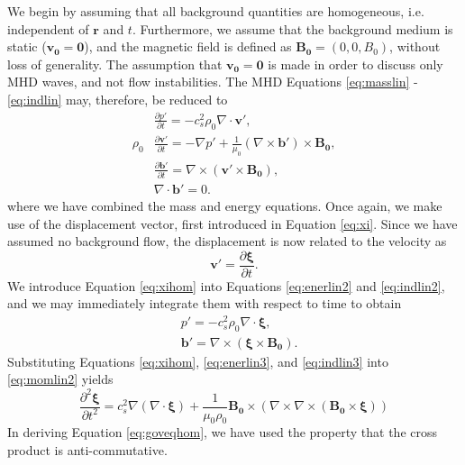 We begin by assuming that all background quantities are homogeneous, i.e. independent of $\mathbf{r}$ and $t$. 
Furthermore, we assume that the background medium is static ($\mathbf{v_0} = \mathbf 0$), and the magnetic field is defined as $\mathbf{B_0} = (0, 0, B_0)$, without loss of generality.
The assumption that $\mathbf{v_0} = \mathbf 0$ is made in order to discuss only MHD waves, and not flow instabilities.
The MHD Equations \eqref{eq:masslin} - \eqref{eq:indlin} may, therefore, be reduced to
%
\begin{align}
\label{eq:enerlin2}
& \frac{\partial p'}{\partial t}
= - c_s^2 \rho_0 \nabla \cdot \mathbf{v'},
\\[0.2cm]
\label{eq:momlin2}
\rho_0 & \frac{\partial \mathbf v'}{\partial t}
= - \nabla p'
+ \frac{1}{\mu_0} (\nabla \times \mathbf{b'}) \times \mathbf{B_0},
\\[0.2cm]
\label{eq:indlin2}
& \frac{\partial \mathbf{b'}}{\partial t}
= \nabla \times (\mathbf{v'} \times \mathbf{B_0}),
\\[0.2cm]
\nonumber
& \nabla \cdot \mathbf{b}' = 0.
\end{align}
%
where we have combined the mass and energy equations.
Once again, we make use of the displacement vector, first introduced in Equation \eqref{eq:xi}.
Since we have assumed no background flow, the displacement is now related to the velocity as
%
\begin{equation}
\label{eq:xihom}
\mathbf{v'}
= \frac{\partial \bm \xi}{\partial t}.
\end{equation}
%
We introduce Equation \eqref{eq:xihom} into Equations \eqref{eq:enerlin2} and \eqref{eq:indlin2}, and we may immediately integrate them with respect to time to obtain
%
\begin{align}
\label{eq:enerlin3}
& p'
= - c_s^2 \rho_0 \nabla \cdot \bm \xi,
\\[0.2cm]
\label{eq:indlin3}
& \mathbf{b'}
= \nabla \times (\bm \xi \times \mathbf{B_0}).
\end{align}
%
Substituting Equations \eqref{eq:xihom}, \eqref{eq:enerlin3}, and \eqref{eq:indlin3} into \eqref{eq:momlin2} yields
%
\begin{equation}
\label{eq:goveqhom}
\frac{\partial^2 \bm \xi}{\partial t^2}
= c_s^2 \nabla (\nabla \cdot \bm \xi)
+ \frac{1}{\mu_0 \rho_0} \mathbf{B_0} \times ( \nabla \times \nabla \times (\mathbf{B_0} \times \bm \xi ))
\end{equation}
%
In deriving Equation \eqref{eq:goveqhom}, we have used the property that the cross product is anti-commutative.

